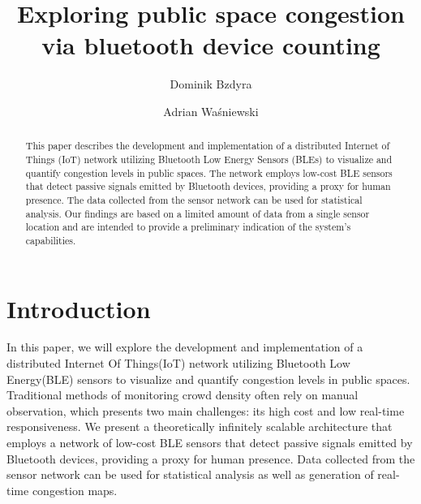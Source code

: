 \documentclass[runningheads]{llncs}
\begin{document}
%
\title{Exploring public space congestion via bluetooth device counting }
%
%
\author{Dominik Bzdyra \and Adrian Waśniewski}
%
%
%
\maketitle              %
%
\begin{abstract}
This paper describes the development and implementation of a distributed Internet of Things (IoT) network utilizing Bluetooth Low Energy Sensors (BLEs) to visualize and quantify congestion levels in public spaces. The network employs low-cost BLE sensors  that detect passive signals emitted by Bluetooth devices, providing a proxy for human presence. The data collected from the sensor network can be used for statistical analysis. Our findings are based on a limited amount of data from a single sensor location and are intended to provide a preliminary indication of the system's capabilities.

\end{abstract}
%
%
%
\section{Introduction}
In this paper, we will explore the development and implementation of a distributed Internet Of Things(IoT) network utilizing Bluetooth Low Energy(BLE) sensors to visualize and quantify congestion levels in public spaces. Traditional methods of monitoring crowd density often rely on manual observation, which presents two main challenges: its high cost and low real-time responsiveness. We present a theoretically infinitely scalable architecture that employs a network of low-cost BLE sensors that detect passive signals emitted by Bluetooth devices, providing a proxy for human presence. Data collected from the sensor network can be used for statistical analysis as well as generation of real-time congestion maps.
\end{document}

